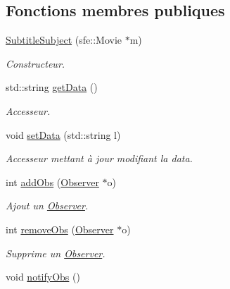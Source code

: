 \subsection*{Fonctions membres publiques}
\begin{DoxyCompactItemize}
\item 
\hyperlink{classSubtitleSubject_af4cc18f5f05474102ec8ee78649fa42c}{Subtitle\+Subject} (sfe\+::\+Movie $\ast$m)
\begin{DoxyCompactList}\small\item\em Constructeur. \end{DoxyCompactList}\item 
std\+::string \hyperlink{classSubtitleSubject_afcb35a1af34b6b926860d544893ae3c4}{get\+Data} ()
\begin{DoxyCompactList}\small\item\em Accesseur. \end{DoxyCompactList}\item 
void \hyperlink{classSubtitleSubject_aa6b5f86666e26cb2ed6e3a282f7d9ded}{set\+Data} (std\+::string l)
\begin{DoxyCompactList}\small\item\em Accesseur mettant à jour modifiant la data. \end{DoxyCompactList}\item 
int \hyperlink{classSubtitleSubject_afc89e947aab454357dce8ea2f80403ee}{add\+Obs} (\hyperlink{classObserver}{Observer} $\ast$o)
\begin{DoxyCompactList}\small\item\em Ajout un \hyperlink{classObserver}{Observer}. \end{DoxyCompactList}\item 
int \hyperlink{classSubtitleSubject_a60e75a2a34275176aaea81738ee4879d}{remove\+Obs} (\hyperlink{classObserver}{Observer} $\ast$o)
\begin{DoxyCompactList}\small\item\em Supprime un \hyperlink{classObserver}{Observer}. \end{DoxyCompactList}\item 
\hypertarget{classSubtitleSubject_a25a62553e49435e7ff42ded01d825b52}{void \hyperlink{classSubtitleSubject_a25a62553e49435e7ff42ded01d825b52}{notify\+Obs} ()}\label{classSubtitleSubject_a25a62553e49435e7ff42ded01d825b52}


\end{DoxyCompactItemize}
